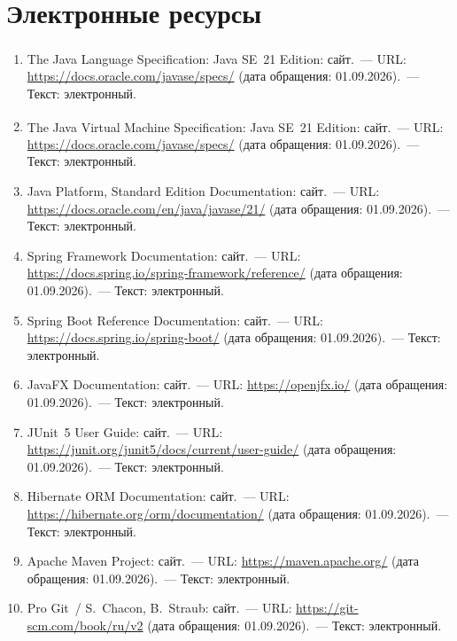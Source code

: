 \section*{Электронные ресурсы}

\begin{enumerate}[leftmargin=*,labelsep=6pt,resume]

\item The Java\textsuperscript{\textregistered} Language Specification:
Java SE~21 Edition: сайт.~--- URL: \url{https://docs.oracle.com/javase/specs/}
(дата обращения: 01.09.2026).~--- Текст: электронный.

\item The Java\textsuperscript{\textregistered} Virtual Machine Specification:
Java SE~21 Edition: сайт.~--- URL: \url{https://docs.oracle.com/javase/specs/}
(дата обращения: 01.09.2026).~--- Текст: электронный.

\item Java Platform, Standard Edition Documentation: сайт.~---
URL: \url{https://docs.oracle.com/en/java/javase/21/} (дата обращения:
01.09.2026).~--- Текст: электронный.

\item Spring Framework Documentation: сайт.~---
URL: \url{https://docs.spring.io/spring-framework/reference/}
(дата обращения: 01.09.2026).~--- Текст: электронный.

\item Spring Boot Reference Documentation: сайт.~---
URL: \url{https://docs.spring.io/spring-boot/} (дата обращения:
01.09.2026).~--- Текст: электронный.

\item JavaFX Documentation: сайт.~--- URL: \url{https://openjfx.io/}
(дата обращения: 01.09.2026).~--- Текст: электронный.

\item JUnit~5 User Guide: сайт.~---
URL: \url{https://junit.org/junit5/docs/current/user-guide/}
(дата обращения: 01.09.2026).~--- Текст: электронный.

\item Hibernate ORM Documentation: сайт.~---
URL: \url{https://hibernate.org/orm/documentation/} (дата обращения:
01.09.2026).~--- Текст: электронный.

\item Apache Maven Project: сайт.~--- URL: \url{https://maven.apache.org/}
(дата обращения: 01.09.2026).~--- Текст: электронный.

\item Pro Git~/ S.~Chacon, B.~Straub: сайт.~---
URL: \url{https://git-scm.com/book/ru/v2} (дата обращения: 01.09.2026).~---
Текст: электронный.

\end{enumerate}
